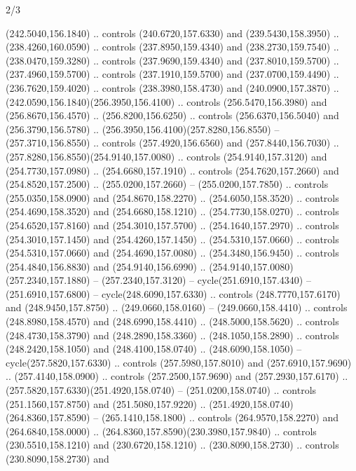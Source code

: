 \begin{flagdescription}{2/3}
\begin{scope}[xshift=0.5\flaglength,yshift=0.5\flagwidth,scale=\flagwidth/259.2]
\begin{scope}[y=0.8pt, x=0.8pt, yscale=-1,shift={(-243,-162)}]
      (242.5040,156.1840) .. controls (240.6720,157.6330) and (239.5430,158.3950) ..
      (238.4260,160.0590) .. controls (237.8950,159.4340) and (238.2730,159.7540) ..
      (238.0470,159.3280) .. controls (237.9690,159.4340) and (237.8010,159.5700) ..
      (237.4960,159.5700) .. controls (237.1910,159.5700) and (237.0700,159.4490) ..
      (236.7620,159.4020) .. controls (238.3980,158.4730) and (240.0900,157.3870) ..
      (242.0590,156.1840)(256.3950,156.4100) .. controls (256.5470,156.3980) and
      (256.8670,156.4570) .. (256.8200,156.6250) .. controls (256.6370,156.5040) and
      (256.3790,156.5780) .. (256.3950,156.4100)(257.8280,156.8550) --
      (257.3710,156.8550) .. controls (257.4920,156.6560) and (257.8440,156.7030) ..
      (257.8280,156.8550)(254.9140,157.0080) .. controls (254.9140,157.3120) and
      (254.7730,157.0980) .. (254.6680,157.1910) .. controls (254.7620,157.2660) and
      (254.8520,157.2500) .. (255.0200,157.2660) -- (255.0200,157.7850) .. controls
      (255.0350,158.0900) and (254.8670,158.2270) .. (254.6050,158.3520) .. controls
      (254.4690,158.3520) and (254.6680,158.1210) .. (254.7730,158.0270) .. controls
      (254.6520,157.8160) and (254.3010,157.5700) .. (254.1640,157.2970) .. controls
      (254.3010,157.1450) and (254.4260,157.1450) .. (254.5310,157.0660) .. controls
      (254.5310,157.0660) and (254.4690,157.0080) .. (254.3480,156.9450) .. controls
      (254.4840,156.8830) and (254.9140,156.6990) ..
      (254.9140,157.0080)(257.2340,157.1880) -- (257.2340,157.3120) --
      cycle(251.6910,157.4340) -- (251.6910,157.6800) -- cycle(248.6090,157.6330) ..
      controls (248.7770,157.6170) and (248.9450,157.8750) .. (249.0660,158.0160) --
      (249.0660,158.4410) .. controls (248.8980,158.4570) and (248.6990,158.4410) ..
      (248.5000,158.5620) .. controls (248.4730,158.3790) and (248.2890,158.3360) ..
      (248.1050,158.2890) .. controls (248.2420,158.1050) and (248.4100,158.0740) ..
      (248.6090,158.1050) -- cycle(257.5820,157.6330) .. controls
      (257.5980,157.8010) and (257.6910,157.9690) .. (257.4140,158.0900) .. controls
      (257.2500,157.9690) and (257.2930,157.6170) ..
      (257.5820,157.6330)(251.4920,158.0740) -- (251.0200,158.0740) .. controls
      (251.1560,157.8750) and (251.5080,157.9220) ..
      (251.4920,158.0740)(264.8360,157.8590) -- (265.1410,158.1800) .. controls
      (264.9570,158.2270) and (264.6840,158.0000) ..
      (264.8360,157.8590)(230.3980,157.9840) .. controls (230.5510,158.1210) and
      (230.6720,158.1210) .. (230.8090,158.2730) .. controls (230.8090,158.2730) and

\end{scope}
\end{scope}
\end{flagdescription}
